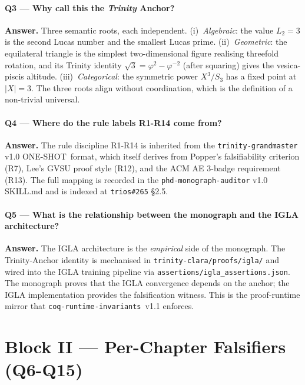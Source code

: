 \paragraph{Q3 — Why call this the \emph{Trinity} Anchor?}

\textbf{Answer.} Three semantic roots, each independent. (i)~\emph{Algebraic}:
the value \(L_2 = 3\) is the second Lucas number and the smallest Lucas
prime. (ii)~\emph{Geometric}: the equilateral triangle is the simplest
two-dimensional figure realising threefold rotation, and its Trinity
identity \(\sqrt{3} = \varphi^{2} - \varphi^{-2}\) (after squaring) gives
the vesica-piscis altitude. (iii)~\emph{Categorical}: the symmetric
power \(X^3 / S_3\) has a fixed point at \(|X| = 3\). The three roots
align without coordination, which is the definition of a non-trivial
universal.

\paragraph{Q4 — Where do the rule labels R1-R14 come from?}

\textbf{Answer.} The rule discipline R1-R14 is inherited from the
\texttt{trinity-grandmaster} v1.0 ONE-SHOT~format, which itself derives
from Popper's falsifiability criterion (R7), Lee's GVSU proof style
(R12), and the ACM AE 3-badge requirement (R13). The full mapping is
recorded in the \texttt{phd-monograph-auditor} v1.0 SKILL.md and is
indexed at \texttt{trios\#265} \S2.5.

\paragraph{Q5 — What is the relationship between the monograph and the IGLA architecture?}

\textbf{Answer.} The IGLA architecture is the \emph{empirical} side of
the monograph. The Trinity-Anchor identity is mechanised in
\texttt{trinity-clara/proofs/igla/} and wired into the IGLA training
pipeline via \texttt{assertions/igla\_assertions.json}. The monograph
proves that the IGLA convergence depends on the anchor; the IGLA
implementation provides the falsification witness. This is the
proof-runtime mirror that \texttt{coq-runtime-invariants}~v1.1 enforces.

\section*{Block II — Per-Chapter Falsifiers (Q6-Q15)}

